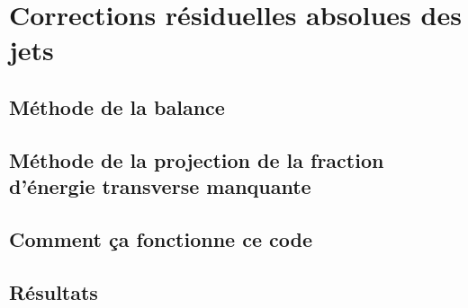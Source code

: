 \section{Corrections résiduelles absolues des jets}

\subsection{Méthode de la balance}

\subsection{Méthode de la projection de la fraction d'énergie transverse manquante}

\subsection{\og Comment ça fonctionne ce code \fg{} }

\subsection{Résultats}
